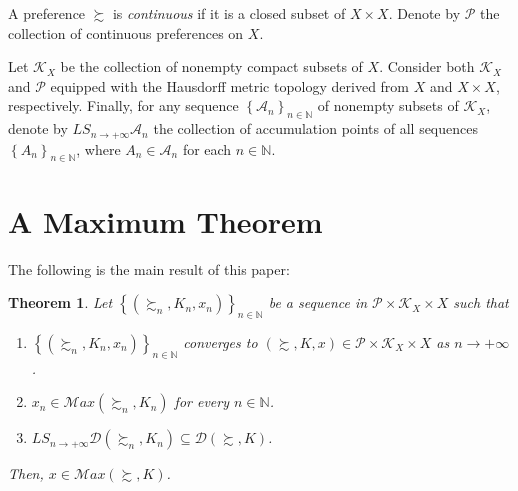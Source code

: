 \documentclass[12pt, oneside]{amsart}
\newtheorem{theorem}{Theorem}
\theoremstyle{definition}
\begin{document}
A preference $\succsim$ is \textit{continuous} if it is a closed subset of $X \times X$. Denote by $\mathcal{P}$ the collection of continuous preferences on $X$. 

Let $\mathcal{K}_X$ be the collection of nonempty compact subsets of $X$. Consider both $\mathcal{K}_X$ and $\mathcal{P}$ equipped with the Hausdorff metric topology derived from $X$ and $X \times X$, respectively. 
Finally, for any sequence $\left\{\mathcal{A}_n\right\}_{n \in \mathbb{N}}$ of nonempty subsets of $\mathcal{K}_X$, denote by $LS_{n \to +\infty} \mathcal{A}_n$ the collection of accumulation points of all sequences $\left\{A_n\right\}_{n \in \mathbb{N}}$, where $A_n \in \mathcal{A}_n$ for each $n \in \mathbb{N}$.



\section{A Maximum Theorem}

The following is the main result of this paper:

\begin{theorem}
\label{th:maximum}
Let $\left\{\left(\succsim_n, K_n, x_n\right)\right\}_{n \in\mathbb{N}}$ be a sequence in $\mathcal{P}\times \mathcal{K}_X \times X$ such that
\begin{enumerate}
\item $\left\{\left(\succsim_n, K_n, x_n\right)\right\}_{n \in \mathbb{N}}$ converges to $\left(\succsim, K, x\right) \in \mathcal{P}\times \mathcal{K}_X \times X$ as $n\to +\infty$.
\item $x_n \in \mathcal{M}ax\left(\succsim_n, K_n\right)$ for every $n \in \mathbb{N}$.
\item $LS_{n \to +\infty} \mathcal{D}\left(\succsim_n, K_n\right) \subseteq \mathcal{D}\left(\succsim, K\right)$.
\end{enumerate}
Then, $x \in \mathcal{M}ax\left(\succsim, K\right)$.
\end{theorem}
\end{document}
